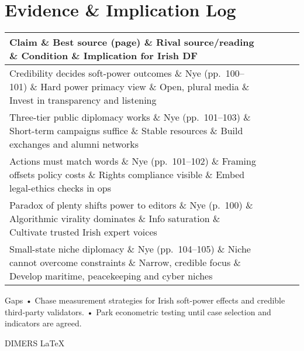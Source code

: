 \section*{Evidence \& Implication Log}
\begin{tabular}{p{3.2cm}p{4.2cm}p{3.6cm}p{3.2cm}p{4.2cm}}
	\textbf{Claim} \& \textbf{Best source (page)} \& \textbf{Rival source/reading} \& \textbf{Condition} \& \textbf{Implication for Irish DF}\\\hline
	Credibility decides soft-power outcomes \& Nye (pp.~100–101) \& Hard power primacy view \& Open, plural media \& Invest in transparency and listening\\
	Three-tier public diplomacy works \& Nye (pp.~101–103) \& Short-term campaigns suffice \& Stable resources \& Build exchanges and alumni networks\\
	Actions must match words \& Nye (pp.~101–102) \& Framing offsets policy costs \& Rights compliance visible \& Embed legal-ethics checks in ops\\
	Paradox of plenty shifts power to editors \& Nye (p.~100) \& Algorithmic virality dominates \& Info saturation \& Cultivate trusted Irish expert voices\\
	Small-state niche diplomacy \& Nye (pp.~104–105) \& Niche cannot overcome constraints \& Narrow, credible focus \& Develop maritime, peacekeeping and cyber niches\\
\end{tabular}


Gaps
• Chase measurement strategies for Irish soft-power effects and credible third-party validators.
• Park econometric testing until case selection and indicators are agreed.

\parencite{KREPINEVICH_1994
}

DIMERS LaTeX

